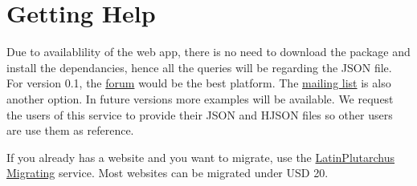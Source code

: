 \documentclass[12pt]{article}
\begin{document}
    \section{Getting Help}

    Due to availablility of the web app, there is no need to download the package and install the dependancies, hence all the queries will be regarding the JSON file. For version 0.1, the \href{http://latinplutarchus/saner_json}{forum} would be the best platform. The \href{http://latinplutarchus/saner_json}{mailing list} is also another option. In future versions more examples will be available. We request the users of this service to provide their JSON and HJSON files so other users are use them as reference. 

    If you already has a website and you want to migrate, use the \href{http://latinplutarchus/saner_json}{LatinPlutarchus Migrating} service. Most websites can be migrated under USD 20. 
\end{document}
